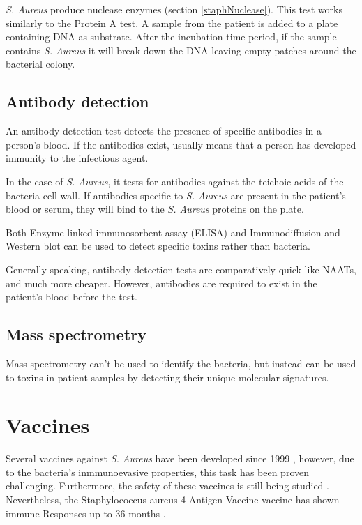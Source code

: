 \textit{S. Aureus} produce nuclease enzymes (section \ref{staphNuclease}). This test works similarly to the Protein A test. A sample from the patient is added to a plate containing DNA as substrate. After the incubation time period, if the sample contains \textit{S. Aureus} it will break down the DNA leaving empty patches around the bacterial colony.

\subsection{Antibody detection}

An antibody detection test detects the presence of specific antibodies in a person's blood. If the antibodies exist, usually means that a person has developed immunity to the infectious agent.

In the case of \textit{S. Aureus}, it tests for antibodies against the teichoic acids of the bacteria cell wall. If antibodies specific to \textit{S. Aureus} are present in the patient's blood or serum, they will bind to the \textit{S. Aureus} proteins on the plate.

Both Enzyme-linked immunosorbent assay (ELISA) and Immunodiffusion and Western blot can be used to detect specific toxins rather than bacteria.

Generally speaking, antibody detection tests are comparatively quick like NAATs, and much more cheaper. However, antibodies are required to exist in the patient's blood before the test.

\subsection{Mass spectrometry}

Mass spectrometry can't be used to identify the bacteria, but instead can be used to toxins in patient samples by detecting their unique molecular signatures.

\section{Vaccines}

Several vaccines against \textit{S. Aureus} have been developed since 1999 \cite{Parastan2020}, however, due to the bacteria's inmmunoevasive properties, this task has been proven challenging. Furthermore, the safety of these vaccines is still being studied \cite{Xu2017}. Nevertheless, the Staphylococcus aureus 4-Antigen Vaccine vaccine has shown immune Responses up to 36 months \cite{Creech2019}.







